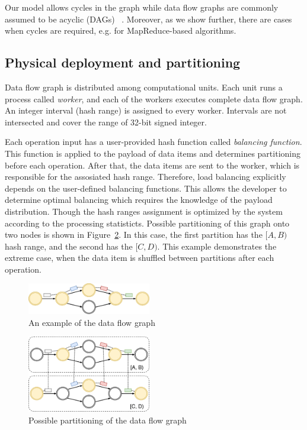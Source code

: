 Our model allows cycles in the graph while data flow graphs are commonly assumed to be acyclic (DAGs) 
~\cite{Zaharia:2016:ASU:3013530.2934664, Carbone:2017:SMA:3137765.3137777}. Moreover, as we show further, there are cases when cycles are required, e.g. for MapReduce-based algorithms. 

\subsection{Physical deployment and partitioning}
Data flow graph is distributed among computational units. Each unit runs a process called {\it worker}, and each of the workers executes complete data flow graph. An integer interval (hash range) is assigned to every worker. Intervals are not intersected and cover the range of 32-bit signed integer.

Each operation input has a user-provided hash function called {\it balancing function}. This function is applied to the payload of data items and determines partitioning before each operation. After that, the data items are sent to the worker, which is responsible for the assosiated hash range. Therefore, load balancing explicitly depends on the user-defined balancing functions. This allows the developer to determine optimal balancing which requires the knowledge of the payload distribution. Though the hash ranges assignment is optimized by the system according to the processing statisticts. Possible partitioning of this graph onto two nodes is shown in Figure~\ref{physical-graph-figure}. In this case, the first partition has the $[A, B)$ hash range, and the second has the $[C, D)$. This example demonstrates the extreme case, when the data item is shuffled between partitions after each operation.

\begin{figure}[htbp]
  \centering
  \includegraphics[width=0.48\textwidth]{pics/logical-graph}
  \caption{An example of the data flow graph}
  \label {logical-graph-figure}
\end{figure}

\begin{figure}[htbp]
  \centering
  \includegraphics[width=0.48\textwidth]{pics/physical-graph}
  \caption{Possible partitioning of the data flow graph}
  \label {physical-graph-figure}
\end{figure}

